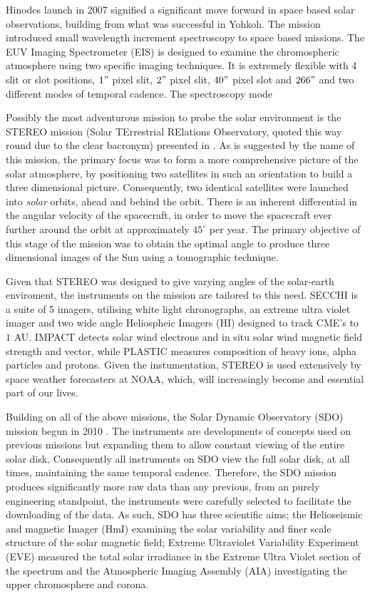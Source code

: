Hinodes launch in 2007 signified a significant move forward in space based solar observations, building from what was successful in Yohkoh.
The mission introduced small wavelength increment spectroscopy to space based missions.
The EUV Imaging Spectrometer (EIS) is designed to examine the chromospheric atmosphere using two specific imaging techniques.
It is extremely flexible with 4 slit or slot positions, $1"$ pixel slit, $2"$ pixel slit, $40"$ pixel slot and $266"$ and two different modes of temporal cadence.
The spectroscopy mode
 


Possibly the most adventurous mission to probe the solar environment is the STEREO mission (Solar TErrestrial RElations Observatory, quoted this way round due to the clear bacronym) presented in \cite{Kaiser2008}.
As is suggested by the name of this mission, the primary focus was to form a more comprehensive picture of the solar atmosphere, by positioning two satellites in such an orientation to build a three dimensional picture.
Consequently, two identical satellites were launched into \emph{solar} orbits, ahead and behind the orbit.
There is an inherent differential in the angular velocity of the spacecraft, in order to move the spacecraft ever further around the orbit at approximately $45^\circ$ per year.
The primary objective of this stage of the mission was to obtain the optimal angle to produce three dimensional images of the Sun using a tomographic technique.

Given that STEREO was designed to give varying angles of the solar-earth  enviroment, the instruments on the mission are tailored to this need.
SECCHI is a suite of 5 imagers, utilising white light chronographs, an extreme ultra violet imager and two wide angle Heliospheic Imagers (HI) designed to track CME's to $1$ AU.
IMPACT detects solar wind electrons and in situ solar wind magnetic field strength and vector, while PLASTIC measures composition of heavy ions, alpha particles and protons. 
Given the instumentation, STEREO is used extensively by space weather forecasters at NOAA, which, will increasingly become and essential part of our lives.

Building on all of the above missions, the Solar Dynamic Observatory (SDO) mission begun in 2010 \cite{Kaiser2008}.
The instruments are developments of concepts used on previous missions but expanding them to allow constant viewing of the entire solar disk.
Consequently all instruments on SDO view the full solar disk, at all times, maintaining the same temporal cadence. 
Therefore, the SDO mission produces significantly more raw data than any previous, from an purely engineering standpoint, the instruments were carefully selected to facilitate the downloading of the data.
As such, SDO has three scientific aims; the Helioseismic and magnetic Imager (HmI) examining the solar variability and finer scale structure of the solar magnetic field; Extreme Ultraviolet Variability Experiment (EVE) measured the total solar irradiance in the Extreme Ultra Violet section of the spectrum and the Atmospheric Imaging Assembly (AIA) investigating the upper chromosphere and corona.

